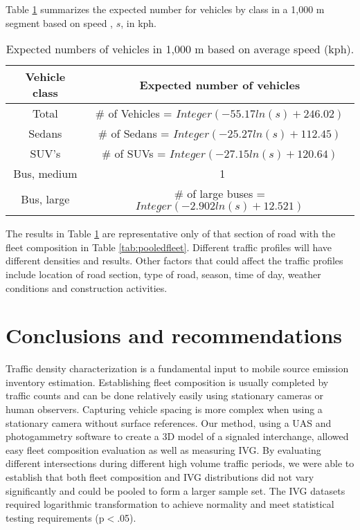 \documentclass[preprint,12pt,a4paper,authoryear]{elsarticle}
\begin{document}
\begin{linenumbers}
Table \ref{tb4:expectedvehicles} summarizes the expected number for vehicles by class in a 1,000 m segment based on speed , $s$, in kph.
%
\begin{table}[H]
\centering
\caption{ Expected numbers of vehicles in 1,000 m based on average speed (kph).}
\label{tb4:expectedvehicles}
\begin{tabular}{@{}cc@{}}
\toprule
\textbf{Vehicle class} & \textbf{Expected number of vehicles } \\ \midrule
Total & \# of Vehicles = $Integer(-55.17ln(s) + 246.02)$ \\
Sedans & \# of Sedans = $Integer (-25.27ln(s) + 112.45)$ \\
SUV's & \# of SUVs = $Integer (-27.15ln(s) + 120.64)$ \\
Bus, medium & \ 1 \\
Bus, large & \# of large buses = $Integer (-2.902ln(s) + 12.521)$ \\ \bottomrule
\end{tabular}
\end{table}
%
The results in Table \ref{tb4:expectedvehicles} are representative only of that section of road with the fleet composition in Table \ref{tab:pooledfleet}.  Different traffic profiles will have different densities and results.  Other factors that could affect the traffic profiles include location of road section, type of road, season, time of day, weather conditions and construction activities. 
 
\section{Conclusions and recommendations}
Traffic density characterization is a fundamental input to mobile source emission inventory estimation. Establishing fleet composition is usually completed by traffic counts and can be done relatively easily using stationary cameras or human observers. Capturing vehicle spacing is more complex when using a stationary camera without surface references. Our method, using a UAS and photogammetry software to create a 3D model of a signaled interchange, allowed easy fleet composition evaluation as well as measuring IVG. By evaluating different intersections during different high volume traffic periods, we were able to establish that both fleet composition and IVG distributions did not vary significantly and could be pooled to form a larger sample set. The IVG datasets required logarithmic transformation to achieve normality and meet statistical testing requirements (p$<$.05).


\end{linenumbers}
\end{document}
